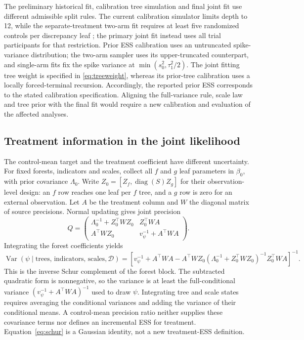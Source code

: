 \documentclass[11pt]{article}
\newcommand{\Var}{\operatorname{Var}}
\theoremstyle{remark}\newtheorem{remark}{Remark}[section]
\providecommand{\DIFaddtex}[1]{{\protect\color{blue} \sf #1}} %
\providecommand{\DIFaddbegin}{} %
\providecommand{\DIFaddend}{} %
\providecommand{\DIFadd}[1]{\texorpdfstring{\DIFaddtex{#1}}{#1}} %
\begin{document}
The preliminary historical fit, calibration tree simulation and final joint fit use different admissible split rules. The current calibration simulator limits depth to 12, while the  \DIFaddbegin \DIFadd{separate-treatment }\DIFaddend two-arm fit  requires at least five randomized controls per discrepancy leaf\DIFaddbegin \DIFadd{; the primary joint fit instead uses all trial participants for that restriction}\DIFaddend . Prior ESS calibration uses an untruncated spike-variance distribution; the two-arm sampler uses its upper-truncated counterpart, and single-arm fits fix the spike variance at $\min(s_0^2,\tau_1^2/2)$. \DIFaddbegin \DIFadd{The joint fitting tree weight is specified in \eqref{eq:treeweight}, whereas its prior-tree calibration uses a locally forced-terminal recursion. }\DIFaddend Accordingly, the reported prior ESS corresponds to the stated calibration specification.  \DIFaddbegin \DIFadd{Aligning the full-variance rule, scale law and tree prior with the final fit would require a new calibration and evaluation of the affected analyses.
}

\subsection{\DIFadd{Treatment information in the joint likelihood}}\label{sec:B.8}
\DIFaddend The  \DIFaddbegin \DIFadd{control-mean target and the treatment coefficient have different uncertainty. For fixed forests, indicators and scales, collect all $f$ }\DIFaddend and  \DIFaddbegin \DIFadd{$g$ leaf parameters in $\beta_0$, with prior covariance $\Lambda_0$. Write $Z_0=[Z_f,\operatorname{diag}(S)Z_g]$ for their observation-level design: an $f$ row reaches one leaf per $f$ tree, and a $g$ row is zero for an external observation. Let $A$ be the treatment column and $W$ the diagonal matrix of source precisions. Normal updating gives joint precision
}\[
Q=\begin{pmatrix}
\Lambda_0^{-1}+Z_0^\top WZ_0&Z_0^\top WA\\
A^\top WZ_0&v_\psi^{-1}+A^\top WA
\end{pmatrix}.
\]
\DIFadd{Integrating the forest coefficients yields
}\begin{equation}\label{eq:schur}
\Var(\psi\mid\text{trees, indicators, scales},\mathcal D)
=\left[v_\psi^{-1}+A^\top WA
-A^\top WZ_0(\Lambda_0^{-1}+Z_0^\top WZ_0)^{-1}Z_0^\top WA\right]^{-1}.
\end{equation}
\DIFadd{This is the inverse Schur complement of the forest block. The subtracted quadratic form is nonnegative, so the variance is at least the full-conditional variance $(v_\psi^{-1}+A^\top WA)^{-1}$ used to draw $\psi$. Integrating tree and scale states requires averaging the conditional variances and adding the variance of their conditional means. A control-mean precision ratio neither supplies these covariance terms nor defines an incremental ESS for treatment. Equation~\eqref{eq:schur} is a Gaussian identity, not a new treatment-ESS definition.
}\DIFaddend 
\end{document}
